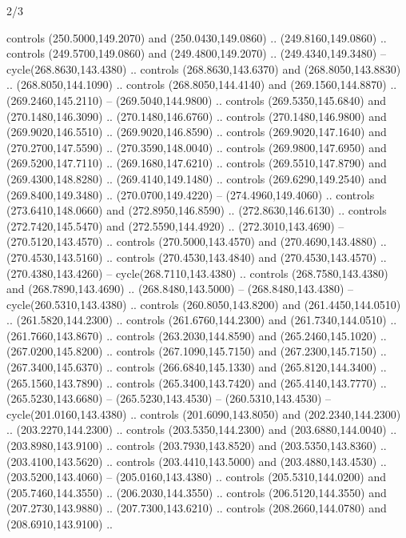 \begin{flagdescription}{2/3}
\begin{scope}[xshift=0.5\flaglength,yshift=0.5\flagwidth,scale=\flagwidth/259.2]
\begin{scope}[y=0.8pt, x=0.8pt, yscale=-1,shift={(-243,-162)}]
      controls (250.5000,149.2070) and (250.0430,149.0860) .. (249.8160,149.0860) ..
      controls (249.5700,149.0860) and (249.4800,149.2070) .. (249.4340,149.3480) --
      cycle(268.8630,143.4380) .. controls (268.8630,143.6370) and
      (268.8050,143.8830) .. (268.8050,144.1090) .. controls (268.8050,144.4140) and
      (269.1560,144.8870) .. (269.2460,145.2110) -- (269.5040,144.9800) .. controls
      (269.5350,145.6840) and (270.1480,146.3090) .. (270.1480,146.6760) .. controls
      (270.1480,146.9800) and (269.9020,146.5510) .. (269.9020,146.8590) .. controls
      (269.9020,147.1640) and (270.2700,147.5590) .. (270.3590,148.0040) .. controls
      (269.9800,147.6950) and (269.5200,147.7110) .. (269.1680,147.6210) .. controls
      (269.5510,147.8790) and (269.4300,148.8280) .. (269.4140,149.1480) .. controls
      (269.6290,149.2540) and (269.8400,149.3480) .. (270.0700,149.4220) --
      (274.4960,149.4060) .. controls (273.6410,148.0660) and (272.8950,146.8590) ..
      (272.8630,146.6130) .. controls (272.7420,145.5470) and (272.5590,144.4920) ..
      (272.3010,143.4690) -- (270.5120,143.4570) .. controls (270.5000,143.4570) and
      (270.4690,143.4880) .. (270.4530,143.5160) .. controls (270.4530,143.4840) and
      (270.4530,143.4570) .. (270.4380,143.4260) -- cycle(268.7110,143.4380) ..
      controls (268.7580,143.4380) and (268.7890,143.4690) .. (268.8480,143.5000) --
      (268.8480,143.4380) -- cycle(260.5310,143.4380) .. controls
      (260.8050,143.8200) and (261.4450,144.0510) .. (261.5820,144.2300) .. controls
      (261.6760,144.2300) and (261.7340,144.0510) .. (261.7660,143.8670) .. controls
      (263.2030,144.8590) and (265.2460,145.1020) .. (267.0200,145.8200) .. controls
      (267.1090,145.7150) and (267.2300,145.7150) .. (267.3400,145.6370) .. controls
      (266.6840,145.1330) and (265.8120,144.3400) .. (265.1560,143.7890) .. controls
      (265.3400,143.7420) and (265.4140,143.7770) .. (265.5230,143.6680) --
      (265.5230,143.4530) -- (260.5310,143.4530) -- cycle(201.0160,143.4380) ..
      controls (201.6090,143.8050) and (202.2340,144.2300) .. (203.2270,144.2300) ..
      controls (203.5350,144.2300) and (203.6880,144.0040) .. (203.8980,143.9100) ..
      controls (203.7930,143.8520) and (203.5350,143.8360) .. (203.4100,143.5620) ..
      controls (203.4410,143.5000) and (203.4880,143.4530) .. (203.5200,143.4060) --
      (205.0160,143.4380) .. controls (205.5310,144.0200) and (205.7460,144.3550) ..
      (206.2030,144.3550) .. controls (206.5120,144.3550) and (207.2730,143.9880) ..
      (207.7300,143.6210) .. controls (208.2660,144.0780) and (208.6910,143.9100) ..

\end{scope}
\end{scope}
\end{flagdescription}
